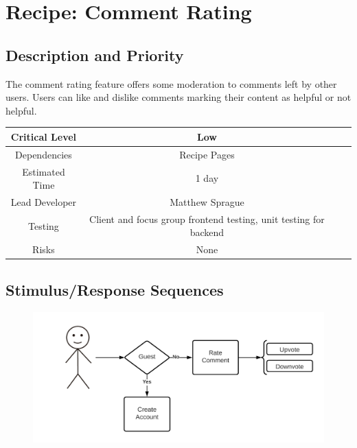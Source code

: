 \documentclass{scrreprt}
\begin{document}
\section{Recipe: Comment Rating}

\subsection{Description and Priority}

The comment rating feature offers some moderation to comments left by other users. Users can like and dislike comments marking their content as helpful or not helpful.

\begin{center}
    \begin{tabular}{| c | c | c | c |}
        \hline
        Critical Level & Low                                                               \\
        \hline
        Dependencies   & Recipe Pages                                                      \\
        \hline
        Estimated Time & 1 day                                                             \\
        \hline
        Lead Developer & Matthew Sprague                                                   \\
        \hline
        Testing         & Client and focus group \gls{frontend} testing,
                          \gls{unit testing} for \gls{backend}                             \\
        \hline
        Risks          & None                                                              \\
        \hline
    \end{tabular}
\end{center}

\subsection{Stimulus/Response Sequences}

\begin{figure}[H]\centering
    \includegraphics[width=\columnwidth]{FlowCharts/Recipe-Comment-Rating.png}
\end{figure}
\end{document}
